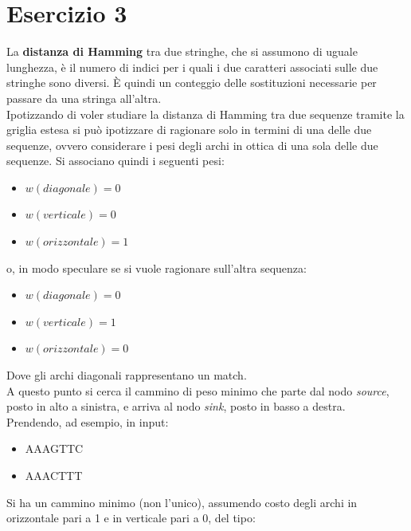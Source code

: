 \documentclass[a4paper,12pt, oneside]{book}
\begin{document}
\chapter{Esercizio 3}
La \textbf{distanza di Hamming} tra due stringhe, che si assumono di uguale
lunghezza, è 
il numero di indici per i quali i due caratteri associati sulle due stringhe
sono diversi. È quindi un conteggio delle sostituzioni necessarie per passare da
una stringa all'altra.\\
Ipotizzando di voler studiare la distanza di Hamming tra due sequenze tramite la
griglia estesa si può ipotizzare di ragionare solo in termini di una delle due
sequenze, ovvero considerare i pesi degli archi in ottica di una sola delle due
sequenze. Si associano quindi i seguenti pesi:
\begin{itemize}
  \item $w(diagonale)=0$
  \item $w(verticale)=0$
  \item $w(orizzontale)=1$
\end{itemize}
o, in modo speculare se si vuole ragionare sull'altra sequenza:
\begin{itemize}
  \item $w(diagonale)=0$
  \item $w(verticale)=1$
  \item $w(orizzontale)=0$
\end{itemize}
Dove gli archi diagonali rappresentano un match.\\
A questo punto si cerca il cammino di peso minimo che parte dal nodo
\textit{source}, posto in alto a sinistra, e arriva al nodo \textit{sink}, posto
in basso a destra.\\
Prendendo, ad esempio, in input:
\begin{itemize}
  \item AAAGTTC
  \item AAACTTT
\end{itemize}
Si ha un cammino minimo (non l'unico), assumendo costo degli archi in
orizzontale pari a 1 e in verticale pari a 0, del tipo:
\end{document}
